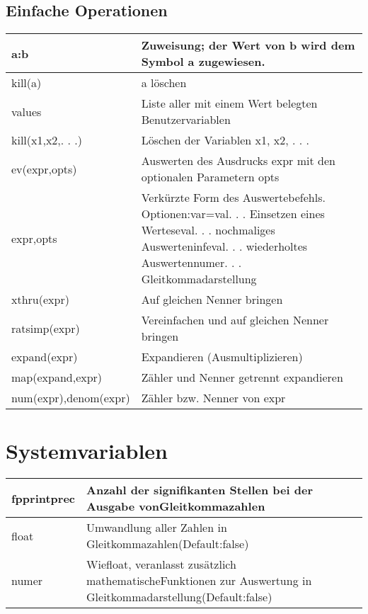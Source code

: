 \documentclass[../main.tex]{subfiles}
\begin{document}
\subsection{Einfache Operationen}
\begin{tabularx}{1.0\textwidth} { 
    >{\centering\arraybackslash}X 
    >{\centering\arraybackslash}X  }
    a:b & Zuweisung; der Wert von b wird dem Symbol a zugewiesen.
    \\ [7pt]
    \hline
    kill(a) & a löschen 
    \\ [7pt]
    \hline
    values & Liste aller mit einem Wert belegten Benutzervariablen
    \\ [7pt]
    \hline
    kill(x1,x2,. . .) & Löschen der Variablen x1, x2, . . .
    \\ [7pt]
    \hline
    ev(expr,opts) & Auswerten des Ausdrucks expr mit den optionalen Parametern opts
    \\ [7pt]
    \hline
    expr,opts & Verkürzte Form des Auswertebefehls. Optionen:var=val. . . Einsetzen eines Werteseval. . . nochmaliges Auswerteninfeval. . . wiederholtes Auswertennumer. . . Gleitkommadarstellung
    \\ [7pt]
    \hline
    xthru(expr) & Auf gleichen Nenner bringen
    \\ [7pt]
    \hline
    ratsimp(expr) & Vereinfachen und auf gleichen Nenner bringen
    \\ [7pt]
    \hline
    expand(expr) & Expandieren (Ausmultiplizieren)
    \\ [7pt]
    \hline
    map(expand,expr) & Zähler und Nenner getrennt expandieren
    \\ [7pt]
    \hline
    num(expr),denom(expr) & Zähler bzw. Nenner von expr
    \\ [7pt]
\end{tabularx}

\section{Systemvariablen}
\begin{tabularx}{1.0\textwidth} { 
    >{\centering\arraybackslash}X 
    >{\centering\arraybackslash}X  }
    fpprintprec & Anzahl der signifikanten Stellen bei der Ausgabe vonGleitkommazahlen
    \\ [7pt]
    \hline
    float & Umwandlung aller Zahlen in Gleitkommazahlen(Default:false)
    \\ [7pt]
    \hline
    numer & Wiefloat, veranlasst zusätzlich mathematischeFunktionen zur Auswertung in Gleitkommadarstellung(Default:false)
    \\ [7pt]
\end{tabularx}
\end{document}
